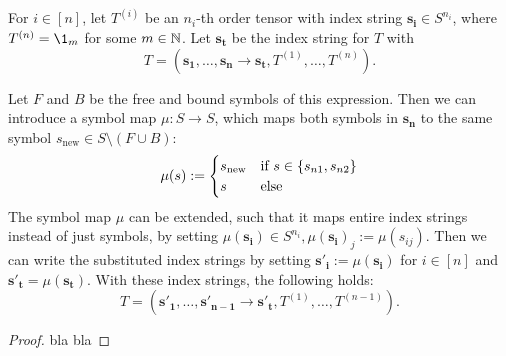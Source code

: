 \begin{lemma}
    For $i \in [n]$, let $T^{(i)}$ be an $n_i$-th order tensor with index string $\bm{s_i} \in S^{n_i}$,
    where $T^{(n)} = \1_m$ for some $m \in \mathbb{N}$.
    Let $\bm{s_t}$ be the index string for $T$ with
    $$T = (\bm{s_1}, \dots, \bm{s_n} \rightarrow \bm{s_t}, T^{(1)}, \dots, T^{(n)}).$$

    Let $F$ and $B$ be the free and bound symbols of this expression.
    Then we can introduce a symbol map $\mu: S \rightarrow S$, which maps both symbols in $\bm{s_n}$ to the same symbol $s_{\text{new}} \in S \setminus (F \cup B)$:
    $$\mu(s) := \begin{cases}
            s_{\text{new}} & \text{if $s \in \lbrace s_{n1}, s_{n2} \rbrace$} \\
            s              & \text{else}
        \end{cases}$$
    The symbol map $\mu$ can be extended, such that it maps entire index strings instead of just symbols, by setting $\mu(\bm{s_i}) \in S^{n_i}, \mu(\bm{s_i})_j := \mu(s_{ij})$.
    Then we can write the substituted index strings by setting $\bm{s'_i} := \mu(\bm{s_i})$ for $i \in [n]$ and $\bm{s'_t} = \mu(\bm{s_t})$.
    With these index strings, the following holds:
    $$T = (\bm{s'_1}, \dots, \bm{s'_{n - 1}} \rightarrow \bm{s'_t}, T^{(1)}, \dots, T^{(n - 1)}).$$
\end{lemma}

\begin{proof}
    \small
    bla bla
\end{proof}